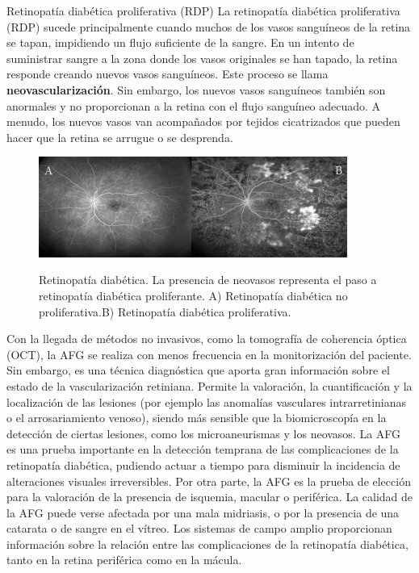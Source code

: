 Retinopatía diabética proliferativa (RDP)
La retinopatía diabética proliferativa (RDP) sucede principalmente cuando muchos de los vasos sanguíneos de la retina se tapan, impidiendo un flujo suficiente de la sangre. En un intento de suministrar sangre a la zona donde los vasos originales se han tapado, la retina responde creando nuevos vasos sanguíneos. Este proceso se llama \textbf{neovascularizaci\'on}. Sin embargo, los nuevos vasos sanguíneos también son anormales y no proporcionan a la retina con el flujo sanguíneo adecuado. A menudo, los nuevos vasos van acompañados por tejidos cicatrizados que pueden hacer que la retina se arrugue o se desprenda.



\begin{figure}[H]
\centering
\includegraphics[width=0.9\textwidth]{./Figures/AF_RDP.png}
\label{fig:lightfilter}
\caption{Retinopatía diabética. La presencia de neovasos representa el paso a retinopatía diabética proliferante. A) Retinopatía diabética no proliferativa.B) Retinopatía diabética proliferativa.}
\end{figure}


Con la llegada de métodos no invasivos, como la tomografía de coherencia óptica (OCT), la AFG se realiza con menos frecuencia en la monitorización del paciente. Sin embargo, es una técnica diagnóstica que aporta gran información sobre el estado de la vascularización retiniana. Permite la valoración, la cuantificación y la localización de las lesiones (por ejemplo las anomalías vasculares intrarretinianas o el arrosariamiento venoso), siendo más sensible que la biomicroscopía en la detección de ciertas lesiones, como los microaneurismas y los neovasos.
La AFG es una prueba importante en la detección temprana de las complicaciones de la retinopatía diabética, pudiendo actuar a tiempo para disminuir la incidencia de alteraciones visuales irreversibles. Por otra parte, la AFG es la prueba de elección para la valoración de la presencia de isquemia, macular o periférica. La calidad de la AFG puede verse afectada por una mala midriasis, o por la presencia de una catarata o de sangre en el vítreo. Los sistemas de campo amplio proporcionan información sobre la relación entre
las complicaciones de la retinopatía diabética, tanto en la retina periférica como en la mácula. 
\\


